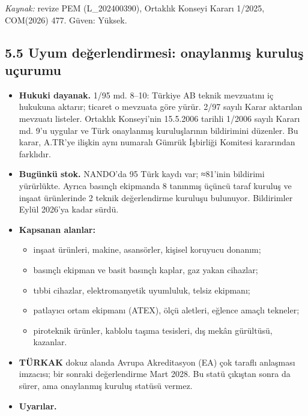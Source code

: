 \emph{Kaynak:} \etiketV{} revize PEM (L\_202400390), Ortaklık Konseyi Kararı 1/2025, COM(2026) 477. Güven: Yüksek.

\hypertarget{02b_secenekler_hukuk-55-uyum-deux11ferlendirmesi-onaylanmux131ux15f-kuruluux15f-uuxe7urumu}{%
\subsection{5.5 Uyum değerlendirmesi: onaylanmış kuruluş uçurumu}\label{02b_secenekler_hukuk-55-uyum-deux11ferlendirmesi-onaylanmux131ux15f-kuruluux15f-uuxe7urumu}}

\begin{itemize}
\tightlist
\item
  \textbf{Hukuki dayanak.} 1/95 md. 8--10: Türkiye AB teknik mevzuatını iç hukukuna aktarır; ticaret o mevzuata göre yürür. 2/97 sayılı Karar aktarılan mevzuatı listeler. Ortaklık Konseyi'nin 15.5.2006 tarihli 1/2006 sayılı Kararı md. 9'u uygular ve Türk onaylanmış kuruluşlarının bildirimini düzenler. Bu karar, A.TR'ye ilişkin aynı numaralı Gümrük İşbirliği Komitesi kararından farklıdır.
\item
  \textbf{Bugünkü stok.} NANDO'da 95 Türk kaydı var; ≈81'inin bildirimi yürürlükte. Ayrıca basınçlı ekipmanda 8 tanınmış üçüncü taraf kuruluş ve inşaat ürünlerinde 2 teknik değerlendirme kuruluşu bulunuyor. Bildirimler Eylül 2026'ya kadar sürdü.
\item
  \textbf{Kapsanan alanlar:}

  \begin{itemize}
  \tightlist
  \item
    inşaat ürünleri, makine, asansörler, kişisel koruyucu donanım;
  \item
    basınçlı ekipman ve basit basınçlı kaplar, gaz yakan cihazlar;
  \item
    tıbbi cihazlar, elektromanyetik uyumluluk, telsiz ekipmanı;
  \item
    patlayıcı ortam ekipmanı (ATEX), ölçü aletleri, eğlence amaçlı tekneler;
  \item
    piroteknik ürünler, kablolu taşıma tesisleri, dış mekân gürültüsü, kazanlar.
  \end{itemize}
\item
  \textbf{TÜRKAK} dokuz alanda Avrupa Akreditasyon (EA) çok taraflı anlaşması imzacısı; bir sonraki değerlendirme Mart 2028. Bu statü çıkıştan sonra da sürer, ama onaylanmış kuruluş statüsü vermez.
\item
  \textbf{Uyarılar.}


\end{itemize}
